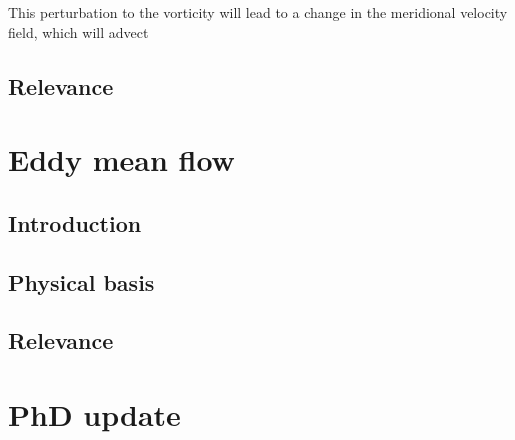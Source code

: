 \documentclass{article}
\begin{document}

This perturbation to the vorticity will lead to a change in the meridional velocity field, which will advect

\subsection*{Relevance}


\section*{Eddy mean flow}

\subsection*{Introduction}


\subsection*{Physical basis}


\subsection*{Relevance}


\section*{PhD update}





\printbibliography
\end{document}
